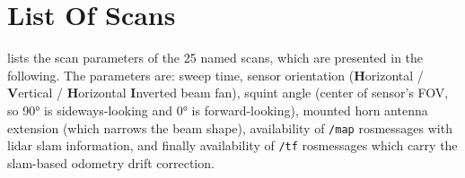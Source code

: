 \chapter{List Of Scans} \label{scans}

 lists the scan parameters of the 25 named scans, which are presented in the following. The parameters are: sweep time, sensor orientation (\textbf{H}orizontal / \textbf{V}ertical / \textbf{H}orizontal \textbf{I}nverted beam fan), squint angle (center of sensor's FOV, so \ang{90} is sideways-looking and \ang{0} is forward-looking), mounted horn antenna extension (which narrows the beam shape), availability of \texttt{/map} rosmessages with lidar slam information, and finally availability of \texttt{/tf} rosmessages which carry the slam-based odometry drift correction.

